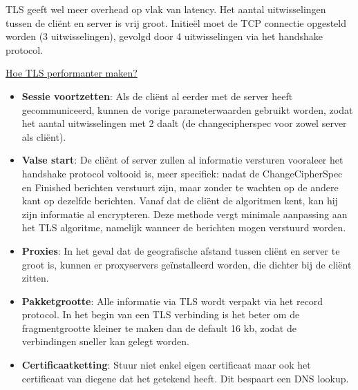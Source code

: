 \documentclass{report}
\begin{document}
	TLS geeft wel meer overhead op vlak van latency. Het aantal uitwisselingen tussen de cliënt en server is vrij groot. Initieël moet de TCP connectie opgesteld worden (3 uitwisselingen), gevolgd door 4 uitwisselingen via het handshake protocol.

	\underline{Hoe TLS performanter maken?}
	\begin{itemize}
		\item \textbf{Sessie voortzetten}: Als de cliënt al eerder met de server heeft gecommuniceerd, kunnen de vorige parameterwaarden gebruikt worden, zodat het aantal uitwisselingen met 2 daalt (de changecipherspec voor zowel server als cliënt).
		\item \textbf{Valse start}: De cliënt of server zullen al informatie versturen vooraleer het handshake protocol voltooid is, meer specifiek: nadat de ChangeCipherSpec en Finished berichten verstuurt zijn, maar zonder te wachten op de andere kant op dezelfde berichten. Vanaf dat de cliënt de algoritmen kent, kan hij zijn informatie al encrypteren. Deze methode vergt minimale aanpassing aan het TLS algoritme, namelijk wanneer de berichten mogen verstuurd worden.
		\item \textbf{Proxies}: In het geval dat de geografische afstand tussen cliënt en server te groot is, kunnen er proxyservers geïnstalleerd worden, die dichter bij de cliënt zitten. 
		\item \textbf{Pakketgrootte}: Alle informatie via TLS wordt verpakt via het record protocol. In het begin van een TLS verbinding is het beter om de fragmentgrootte kleiner te maken dan de default 16 kb, zodat de verbindingen sneller kan gelegt worden.
		\item \textbf{Certificaatketting}: Stuur niet enkel eigen certificaat maar ook het certificaat van diegene dat het getekend heeft. Dit bespaart een DNS lookup.
	\end{itemize}
\end{document}
